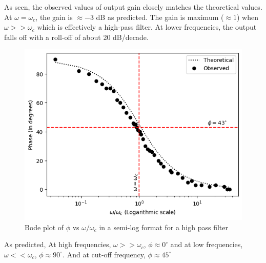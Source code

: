 As seen, the observed values of output gain closely matches the theoretical values. At $\omega = \omega_c$, the gain is $\approx -3$ dB as predicted. The gain is maximum ($\approx 1$) when $\omega >> \omega_c$ which is effectively a high-pass filter. At lower frequencies, the output falls off with a roll-off of about 20 dB/decade.

\begin{figure}[H]
    \centering
    \includegraphics[width=0.9\columnwidth]{images/g4.png}
    \caption{Bode plot of $\phi$ vs $\omega/\omega_c$ in a semi-log format for a high pass filter}
    \label{graph:4}
\end{figure}

As predicted, At high frequencies, $\omega >> \omega_c$, $\phi \approx 0^{\circ}$ and at low frequencies, $\omega << \omega_c$, $\phi \approx 90^{\circ}$. And at cut-off frequency, $\phi \approx 45^{\circ}$